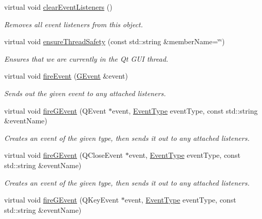 \begin{DoxyCompactItemize}
\item 
virtual void \mbox{\hyperlink{classsgl_1_1GObservable_a80cfa040459ff53594adbd6a51ec8f43}{clear\+Event\+Listeners}} ()
\begin{DoxyCompactList}\small\item\em Removes all event listeners from this object. \end{DoxyCompactList}\item 
virtual void \mbox{\hyperlink{classsgl_1_1GObservable_a284f31528c0520f8e545c03ac9eeac74}{ensure\+Thread\+Safety}} (const std\+::string \&member\+Name=\char`\"{}\char`\"{})
\begin{DoxyCompactList}\small\item\em Ensures that we are currently in the Qt G\+UI thread. \end{DoxyCompactList}\item 
virtual void \mbox{\hyperlink{classsgl_1_1GObservable_a63e5e5a6227c59c928493b11aceb0f67}{fire\+Event}} (\mbox{\hyperlink{classsgl_1_1GEvent}{G\+Event}} \&event)
\begin{DoxyCompactList}\small\item\em Sends out the given event to any attached listeners. \end{DoxyCompactList}\item 
virtual void \mbox{\hyperlink{classsgl_1_1GObservable_ab3983ea07337b52020a29cc00c653d8d}{fire\+G\+Event}} (Q\+Event $\ast$event, \mbox{\hyperlink{namespacesgl_a2628ea8d12e8b2563c32f05dc7fff6fa}{Event\+Type}} event\+Type, const std\+::string \&event\+Name)
\begin{DoxyCompactList}\small\item\em Creates an event of the given type, then sends it out to any attached listeners. \end{DoxyCompactList}\item 
virtual void \mbox{\hyperlink{classsgl_1_1GObservable_a01fdf1b0e0dbd49e189fe4514e010411}{fire\+G\+Event}} (Q\+Close\+Event $\ast$event, \mbox{\hyperlink{namespacesgl_a2628ea8d12e8b2563c32f05dc7fff6fa}{Event\+Type}} event\+Type, const std\+::string \&event\+Name)
\begin{DoxyCompactList}\small\item\em Creates an event of the given type, then sends it out to any attached listeners. \end{DoxyCompactList}\item 
virtual void \mbox{\hyperlink{classsgl_1_1GObservable_abb0b2f66ba39211cb5d7615e9d1c04e2}{fire\+G\+Event}} (Q\+Key\+Event $\ast$event, \mbox{\hyperlink{namespacesgl_a2628ea8d12e8b2563c32f05dc7fff6fa}{Event\+Type}} event\+Type, const std\+::string \&event\+Name)

\end{DoxyCompactItemize}
